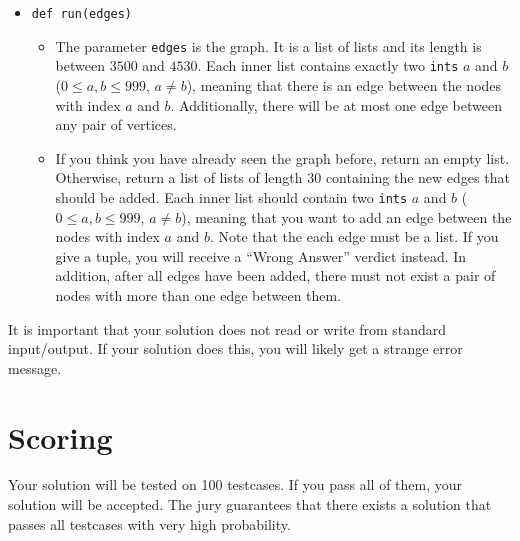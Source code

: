 \begin{itemize}
  \item \verb|def run(edges)| \\
  \begin{itemize}
    \item The parameter \texttt{edges} is the graph. It is a list of lists and its length is between $3500$ and $4530$.
    Each inner list contains exactly two \texttt{ints} $a$ and $b$ ($0 \leq a,b \leq 999$, $a \neq b$),
    meaning that there is an edge between the nodes with index $a$ and $b$. Additionally,
    there will be at most one edge between any pair of vertices.
    \item If you think you have already seen the graph before, return an empty list.\\
    Otherwise, return a list of lists of length 30 containing the new edges that should be added.
    Each inner list should contain two \texttt{ints} $a$ and $b$ ($0 \leq a,b \leq 999$, $a \neq b$),
    meaning that you want to add an edge between the nodes with index $a$ and $b$.
    Note that the each edge must be a list. If you give a tuple, you will receive a ``Wrong Answer'' verdict instead.
    In addition, after all edges have been added, there must not exist a pair of nodes with more than one edge between them.
  \end{itemize}
\end{itemize}

It is important that your solution does not read or write from standard input/output. If your solution does this, 
you will likely get a strange error message.

\section*{Scoring}
Your solution will be tested on 100 testcases. If you pass all of them, your solution will be accepted.
The jury guarantees that there exists a solution that passes all testcases with very high probability.
